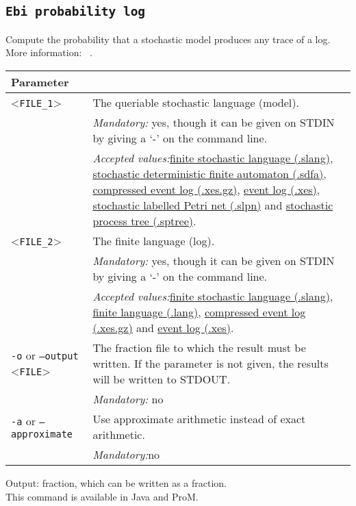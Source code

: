 {\subsection{\texttt{Ebi probability log}}
\label{command:Ebi probability log}
Compute the probability that a stochastic model produces any trace of a log.\\
More information: ~\cite{DBLP:journals/is/LeemansMM24}.\\
\begin{tabularx}{\linewidth}{lX}
\toprule
Parameter \\\midrule
<\texttt{FILE\_1}>&The queriable stochastic language (model).\\
&\textit{Mandatory:} \quad yes, though it can be given on STDIN by giving a `-' on the command line.\\
&\textit{Accepted values:}\quad \hyperref[filehandler:finite stochastic language]{finite stochastic language (.slang)}, \hyperref[filehandler:stochastic deterministic finite automaton]{stochastic deterministic finite automaton (.sdfa)}, \hyperref[filehandler:compressed event log]{compressed event log (.xes.gz)}, \hyperref[filehandler:event log]{event log (.xes)}, \hyperref[filehandler:stochastic labelled Petri net]{stochastic labelled Petri net (.slpn)} and \hyperref[filehandler:stochastic process tree]{stochastic process tree (.sptree)}.\\
<\texttt{FILE\_2}>&The finite language (log).\\
&\textit{Mandatory:} \quad yes, though it can be given on STDIN by giving a `-' on the command line.\\
&\textit{Accepted values:}\quad \hyperref[filehandler:finite stochastic language]{finite stochastic language (.slang)}, \hyperref[filehandler:finite language]{finite language (.lang)}, \hyperref[filehandler:compressed event log]{compressed event log (.xes.gz)} and \hyperref[filehandler:event log]{event log (.xes)}.\\
\texttt{-o} or \texttt{--output} <\texttt{FILE}> &
The fraction file to which the result must be written. If the parameter is not given, the results will be written to STDOUT.\\
&\textit{Mandatory:} \quad no\\
\texttt{-a} or \texttt{--approximate} & Use approximate arithmetic instead of exact arithmetic.\\
&\textit{Mandatory:}\quad no\\
\bottomrule
\end{tabularx}
\noindent Output: fraction, which can be written as a fraction.
\\This command is available in Java and ProM.
}

